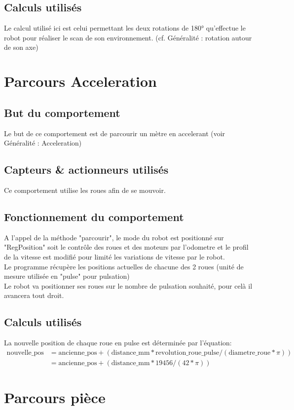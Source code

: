 \documentclass[11pt]{article} %
\begin{document}
        	\subsection{Calculs utilisés}
			Le calcul utilisé ici est celui permettant les deux rotations de 180° qu'effectue le robot pour réaliser le scan de son environnement. (cf. Généralité : rotation autour de son axe)
\pagebreak
	\section{Parcours Acceleration}
		\subsection{But du comportement}
			Le but de ce comportement est de parcourir un mètre en accelerant (voir Généralité : Acceleration) 
		\subsection{Capteurs \& actionneurs utilisés}
			Ce comportement utilise les roues afin de se mouvoir.
		\subsection{Fonctionnement du comportement}
			 A l'appel de la méthode "parcourir", le mode du robot est positionné sur "RegPosition" soit le contrôle des roues et des moteurs par l'odometre et le profil de la vitesse est modifié pour limité les variations de vitesse par le robot. \\ Le programme récupère les positions actuelles de chacune des 2 roues (unité de mesure utilisée en "pulse" pour pulsation) \\ Le robot va positionner ses roues sur le nombre de pulsation souhaité, pour celà il avancera tout droit.
		\subsection{Calculs utilisés}
			La nouvelle position de chaque roue en pulse est déterminée par l'équation:
			\begin{align*}
				\text{nouvelle\_pos} &= \text{ancienne\_pos} + (\text{distance\_mm}*\text{revolution\_roue\_pulse} / (\text{diametre\_roue}*\pi)) \\
                   			            	      &= \text{ancienne\_pos} + (\text{distance\_mm} * 19456 / (42 * \pi))
			\end{align*}
\pagebreak
\section{Parcours pièce}
\end{document}
